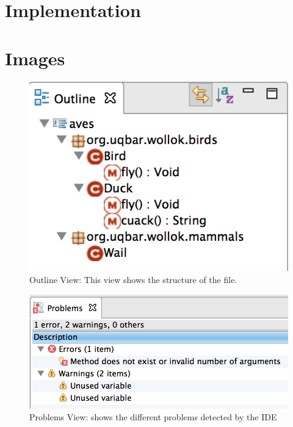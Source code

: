 \section{Implementation}
\label{sec:implementation}

\section{Images}

	\begin{figure}[p]
	    \centering
		\includegraphics[scale=0.5]{images/wollok-paper-outline.png}
	    \caption{Outline View: This view shows the structure of the file.}
	    \label{fig:outline.png}
	\end{figure}
	
	\begin{figure}[p]
	    \centering
		\includegraphics[scale=0.5]{images/wollok-paper-check-problemsview.png}
	    \caption{Problems View: shows the different problems detected by the IDE }
	    \label{fig:problemsview.png}
	\end{figure}
	
